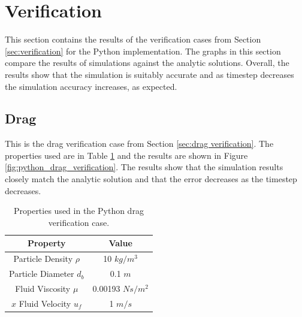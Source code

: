 \documentclass[a4paper,11pt,titlepage]{report}
\begin{document}
\section{Verification}
\label{sec:Python verification}
This section contains the results of the verification cases from Section \ref{sec:verification} for the Python implementation. The graphs in this section compare the results of simulations against the analytic solutions. Overall, the results show that the simulation is suitably accurate and as timestep decreases the simulation accuracy increases, as expected.
\subsection{Drag}
This is the drag verification case from Section \ref{sec:drag verification}. The properties used are in Table \ref{tab:python drag properties} and the results are shown in Figure \ref{fig:python_drag_verification}. The results show that the simulation results closely match the analytic solution and that the error decreases as the timestep decreases.
\begin{table}[!htb]
\centering
\begin{tabular}{| c c |}
\hline
Property & Value\\
\hline
Particle Density $\rho$ & 10 $kg/m^3$ \\
Particle Diameter $d_b$ & 0.1 $m$ \\
Fluid Viscosity $\mu$ & 0.00193 $Ns/m^2$ \\
$x$ Fluid Velocity $u_f$ & 1 $m/s$ \\
\hline
\end{tabular}
\caption{Properties used in the Python drag verification case.}
\label{tab:python drag properties}
\end{table}
\end{document}

